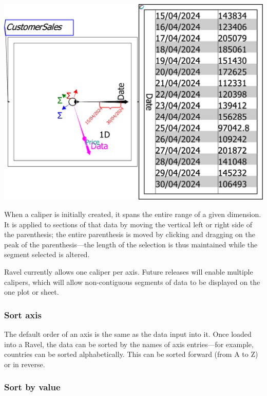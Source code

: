 \includegraphics[width=15cm]{images/SmallBusinessCalipers}

When a caliper is initially created, it spans the entire range of
a given dimension. It is applied to sections of that data by moving
the vertical left or right side of the parenthesis; the entire parenthesis
is moved by clicking and dragging on the peak of the parenthesis---the
length of the selection is thus maintained while the segment selected
is altered.

Ravel currently allows one caliper per axis. Future releases will
enable multiple calipers, which will allow non-contiguous segments
of data to be displayed on the one plot or sheet.

\subsubsection{Sort axis}

The default order of an axis is the same as the data input into it.
Once loaded into a Ravel, the data can be sorted by the names of axis
entries---for example, countries can be sorted alphabetically. This
can be sorted forward (from A to Z) or in reverse.

\subsubsection{Sort by value}

